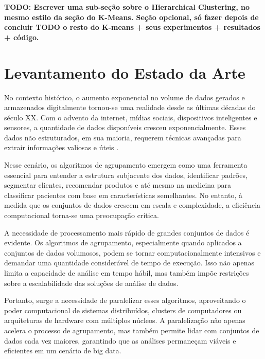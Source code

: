 \documentclass[12pt,
openright, 
oneside, %
a4paper,    %
brazil]{facom-ufu-abntex2}
\begin{document}
\textbf{TODO: Escrever uma sub-seção sobre o Hierarchical Clustering, no mesmo estilo da seção do K-Means. Seção opcional, só fazer depois de concluir TODO o resto do K-means + seus experimentos + resultados + código.}





\chapter{Levantamento do Estado da Arte}

No contexto histórico, o aumento exponencial no volume de dados gerados e armazenados digitalmente tornou-se uma realidade desde as últimas décadas do século XX. Com o advento da internet, mídias sociais, dispositivos inteligentes e sensores, a quantidade de dados disponíveis cresceu exponencialmente. Esses dados não estruturados, em sua maioria, requerem técnicas avançadas para extrair informações valiosas e úteis \cite{dataMining2012-preface}.

Nesse cenário, os algoritmos de agrupamento emergem como uma ferramenta essencial para entender a estrutura subjacente dos dados, identificar padrões, segmentar clientes, recomendar produtos e até mesmo na medicina para classificar pacientes com base em características semelhantes. No entanto, à medida que os conjuntos de dados crescem em escala e complexidade, a eficiência computacional torna-se uma preocupação crítica.

A necessidade de processamento mais rápido de grandes conjuntos de dados é evidente. Os algoritmos de agrupamento, especialmente quando aplicados a conjuntos de dados volumosos, podem se tornar computacionalmente intensivos e demandar uma quantidade considerável de tempo de execução. Isso não apenas limita a capacidade de análise em tempo hábil, mas também impõe restrições sobre a escalabilidade das soluções de análise de dados.

Portanto, surge a necessidade de paralelizar esses algoritmos, aproveitando o poder computacional de sistemas distribuídos, clusters de computadores ou arquiteturas de hardware com múltiplos núcleos. A paralelização não apenas acelera o processo de agrupamento, mas também permite lidar com conjuntos de dados cada vez maiores, garantindo que as análises permaneçam viáveis e eficientes em um cenário de big data.
\end{document}
